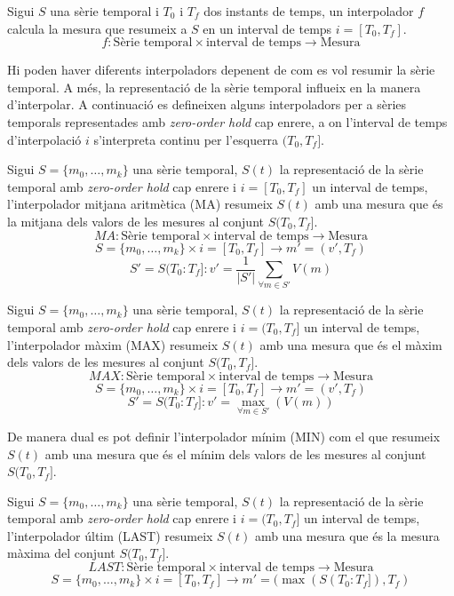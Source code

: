 Sigui $S$ una sèrie temporal i $T_0$ i $T_f$ dos instants de temps, un interpolador $f$ calcula la mesura que resumeix a $S$ en un interval de temps $i=[T_0,T_f]$. 
\[
f: \text{Sèrie temporal} \times \text{interval de temps} \longrightarrow \text{Mesura}
\]

Hi poden haver diferents interpoladors depenent de com es vol resumir la sèrie temporal. A més, la representació de la sèrie temporal influeix en la manera d'interpolar. A continuació es defineixen alguns interpoladors per a sèries temporals representades amb  \emph{zero-order hold} cap enrere, a on l'interval de temps d'interpolació $i$ s'interpreta continu per l'esquerra $(T_0,T_f]$. 


\begin{definition}
  Sigui $S=\{m_0,\ldots,m_k\}$ una sèrie temporal, $S(t)$ la
  representació de la sèrie temporal amb \emph{zero-order hold} cap
  enrere i $i=[T_0,T_f]$ un interval de temps, l'interpolador mitjana
  aritmètica (MA) resumeix $S(t)$ amb una mesura que és la mitjana dels
  valors de les mesures al conjunt $S(T_0,T_f]$.
\[
MA: \text{Sèrie temporal} \times \text{interval de temps}
\longrightarrow \text{Mesura}
\]
\[
S=\{m_0,\ldots,m_k\} \times i=[T_0,T_f] \longrightarrow m'=(v',T_f)
\]
\[
S'=S(T_0:T_f]:
v' = \frac{1}{|S'|} \sum\limits_{\forall m\in S'} V(m)
\]
\end{definition}

\begin{definition}
  Sigui $S=\{m_0,\ldots,m_k\}$ una sèrie temporal, $S(t)$ la
  representació de la sèrie temporal amb \emph{zero-order hold} cap
  enrere i $i=(T_0,T_f]$ un interval de temps, l'interpolador màxim
  (MAX) resumeix $S(t)$ amb una mesura que és el màxim dels valors
  de les mesures al conjunt $S(T_0,T_f]$.
\[
MAX: \text{Sèrie temporal} \times \text{interval de temps} \longrightarrow \text{Mesura}
\]
\[
S=\{m_0,\ldots,m_k\} \times i=[T_0,T_f]  \longrightarrow m'=(v',T_f)
\]
\[
S'=S(T_0:T_f]:
v' = \max_{\forall m \in S'}(V(m))
\]
\end{definition}

De manera dual es pot definir l'interpolador mínim (MIN) com el
que resumeix $S(t)$ amb una mesura que és el mínim dels valors de les
mesures al conjunt $S(T_0,T_f]$.


\begin{definition}
  Sigui $S=\{m_0,\ldots,m_k\}$ una sèrie temporal, $S(t)$ la
  representació de la sèrie temporal amb \emph{zero-order hold} cap
  enrere i $i=(T_0,T_f]$ un interval de temps, l'interpolador últim
  (LAST) resumeix $S(t)$ amb una mesura que és la mesura màxima del
  conjunt $S(T_0,T_f]$.
\[
LAST: \text{Sèrie temporal} \times \text{interval de temps} \longrightarrow \text{Mesura}
\]
\[
S=\{m_0,\ldots,m_k\} \times i=[T_0,T_f]  \longrightarrow m'=(\max(S(T_0:T_f]),T_f)
\]
\end{definition}



